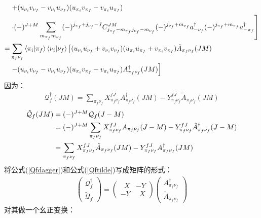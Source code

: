 \documentclass[master]{shnuthesis}
\begin{document}
\begin{align}
    & \left. + (u_{\nu_i}v_{\nu_f}-v_{\nu_i}u_{\nu_f})(u_{\pi_i}v_{\pi_f}-v_{\pi_i}u_{\pi_f})\right. \notag\\
    & \left. \cdot (-)^{J+M} \sum_{m_{\pi_f}m_{\nu_f}} (-)^{j_{\pi_f}+j_{\nu_f}-J}C_{j_{\pi_f} -m_{\pi_f} j_{\nu_f} -m_{\nu_f}}^{JM} (-)^{j_{\nu_f}+m_{\nu_f}}a_{-\nu_f}^\dagger (-)^{j_{\pi_f}+m_{\pi_f}}a_{-\pi_f}^\dagger\right] \notag\\
    = & \sum_{\pi_f \nu_f}\left\langle \pi_i|\pi_f \right\rangle\left\langle \nu_i|\nu_f \right\rangle \left[(u_{\nu_i}u_{\nu_f}+v_{\nu_i}v_{\nu_f})(u_{\pi_i}u_{\pi_f}+v_{\pi_i}v_{\pi_f}) \tilde{A}_{\pi_f\nu_f}(JM) \right. \notag\\
    & \left. - (u_{\nu_i}v_{\nu_f}-v_{\nu_i}u_{\nu_f})(u_{\pi_i}v_{\pi_f}-v_{\pi_i}u_{\pi_f}) A_{\pi_f\nu_f}^\dagger(JM) \right] \label{QiJM2}
\end{align}
因为：
\begin{align}
    \mathcal{Q}_f^\dagger(JM) = \sum_{\pi_f\nu_f} X_{\pi_f\nu_f}^{fJ} A_{\pi_f\nu_f}^\dagger(JM) - Y_{\pi_f\nu_f}^{fJ} \tilde{A}_{\pi_f\nu_f}(JM) \label{Qfdagger}
\end{align}
\begin{align}
    \tilde{\mathcal{Q}}_f(JM) &= (-)^{J+M} \mathcal{Q}_f(J-M) \notag\\
    &= (-)^{J+M} \sum_{\pi_f\nu_f} X_{\pi_f\nu_f}^{fJ} A_{\pi_f\nu_f}(J-M) - Y_{\pi_f\nu_f}^{fJ} \tilde{A}_{\pi_f\nu_f}^\dagger(J-M) \notag\\
    &= \sum_{\pi_f\nu_f} X_{\pi_f\nu_f}^{fJ} \tilde{A}_{\pi_f\nu_f}(JM) - Y_{\pi_f\nu_f}^{fJ} A_{\pi_f\nu_f}^\dagger(JM) \label{Qftilde}
\end{align}
将公式(\ref{Qfdagger})和公式(\ref{Qftilde})写成矩阵的形式：
\begin{align}
    \left(\begin{array}{l} \mathcal{Q}_f^\dagger \\ \tilde{\mathcal{Q}}_f \end{array}\right) = \left(\begin{array}{ll} \,\,\,X & - Y  \\  - Y & \,\,\,X \end{array}\right) \left(\begin{array}{l} A_{\pi_f\nu_f}^\dagger \\ \tilde{A}_{\pi_f\nu_f} \end{array}\right)
\end{align}
对其做一个幺正变换：
\end{document}
